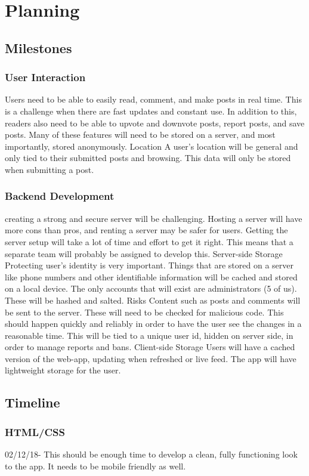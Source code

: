 \documentclass[12pt]{article}
\begin{document}
\section{Planning}
\subsection{Milestones}
\subsubsection{User Interaction}
	Users need to be able to easily read, comment, and make posts in real time. This is a challenge when there are fast updates and constant use. In addition to this, readers also need to be able to upvote and downvote posts, report posts, and save posts. Many of these features will need to be stored on a server, and most importantly, stored anonymously.
Location
	A user’s location will be general and only tied to their submitted posts and browsing. This data will only be stored when submitting a post.
\subsubsection{Backend Development}
	creating a strong and secure server will be challenging. Hosting a server will have more cons than pros, and renting a server may be safer for users. Getting the server setup will take a lot of time and effort to get it right. This means that a separate team will probably be assigned to 	develop this.
Server-side Storage
	Protecting user’s identity is very important. Things that are stored on a server like phone 	numbers and other identifiable information will be cached and stored on a local device. The 	only accounts that will exist are administrators (5 of us). These will be hashed and salted.
Risks
	Content such as posts and comments will be sent to the server. These will need to be checked for malicious code. This should happen quickly and reliably in order to have the user see the changes in a reasonable time. This will be tied to a unique user id, hidden on server side, in 	order to manage reports and bans.
Client-side Storage
	Users will have a cached version of the web-app, updating when refreshed or live feed. The app will have lightweight storage for the user.

\subsection{Timeline}
\subsubsection{HTML/CSS}
	02/12/18- This should be enough time to develop a clean, fully functioning look to the app. It needs to be mobile friendly as well.
\end{document}
